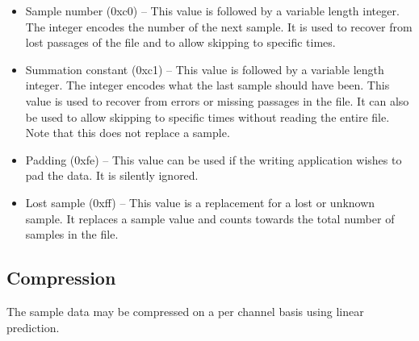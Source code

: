 \documentclass[DIV=10]{scrartcl}
\begin{document}
\begin{itemize}
  \item Sample number (0xc0) – This value is followed by a variable length integer.
  The integer encodes the number of the next sample.
  It is used to recover from lost passages of the file and to allow skipping to specific times.
  \item Summation constant (0xc1) – This value is followed by a variable length integer.
  The integer encodes what the last sample should have been.
  This value is used to recover from errors or missing passages in the file.
  It can also be used to allow skipping to specific times without reading the entire file.
  Note that this does not replace a sample.
  \item Padding (0xfe) – This value can be used if the writing application wishes to pad the data.
  It is silently ignored.
  \item Lost sample (0xff) – This value is a replacement for a lost or unknown sample.
  It replaces a sample value and counts towards the total number of samples in the file.
\end{itemize}

\subsection{Compression}
\label{compression}

The sample data may be compressed on a per channel basis using linear prediction.
\end{document}
